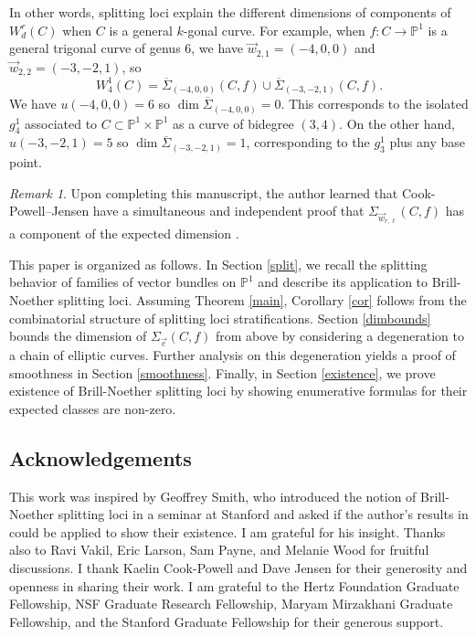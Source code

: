 \documentclass[12pt]{amsart}
\newcommand{\pp}{\mathbb{P}}
\newcommand{\Sigmabar}{\overline{\Sigma}}
\theoremstyle{definition}
\theoremstyle{remark}
\newtheorem*{remark}{Remark}
\theoremstyle{remark}
\numberwithin{equation}{section}
\begin{document}
In other words, splitting loci explain the different dimensions of components of $W^r_d(C)$ when $C$ is a general $k$-gonal curve. 
For example, when $f\colon  C \rightarrow \pp^1$ is a general trigonal curve of genus $6$, we have $\vec{w}_{2,1} = (-4, 0, 0)$ and $\vec{w}_{2,2} = (-3, -2, 1)$, so
\[W^1_4(C) = \Sigmabar_{(-4, 0, 0)}(C, f) \cup \Sigmabar_{(-3, -2, 1)}(C, f).\]
We have $u(-4, 0, 0) = 6$ so $\dim \Sigmabar_{(-4, 0, 0)} = 0$. This corresponds to the isolated $g^1_4$ associated to $C \subset \pp^1 \times \pp^1$ as a curve of bidegree $(3, 4)$. On the other hand, $u(-3, -2, 1) = 5$ so $\dim \Sigmabar_{(-3, -2, 1)} = 1$, corresponding to the $g^1_3$ plus any base point. 

\begin{remark}
Upon completing this manuscript, the author learned that Cook-Powell--Jensen have a simultaneous and independent proof that $\Sigma_{\vec{w}_{r,\ell}}(C, f)$ has a component of the expected dimension \cite{CPJ}.
\end{remark}

This paper is organized as follows. In Section \ref{split}, we recall the splitting behavior of families of vector bundles on $\pp^1$ and describe its application to Brill-Noether splitting loci. Assuming Theorem \ref{main}, Corollary \ref{cor} follows from the combinatorial structure of splitting loci stratifications. Section \ref{dimbounds} bounds the dimension of $\Sigma_{\vec{e}}(C, f)$ from above by considering a degeneration to a chain of elliptic curves. Further analysis on this degeneration yields a proof of smoothness in Section \ref{smoothness}.
 Finally, in Section \ref{existence}, we prove existence of Brill-Noether splitting loci by showing enumerative formulas for their expected classes are non-zero.


\subsection*{Acknowledgements} This work was inspired by Geoffrey Smith, who introduced the notion of Brill-Noether splitting loci in a seminar at Stanford and asked if the author's results in \cite{L} could be applied to show their existence. I am grateful for his insight. Thanks also to Ravi Vakil, Eric Larson, Sam Payne, and Melanie Wood for fruitful discussions.  I thank Kaelin Cook-Powell and Dave Jensen for their generosity and openness in sharing their work. I am grateful to the Hertz Foundation Graduate Fellowship, NSF Graduate Research Fellowship, Maryam Mirzakhani Graduate Fellowship, and the Stanford Graduate Fellowship for their generous support.
\end{document}

